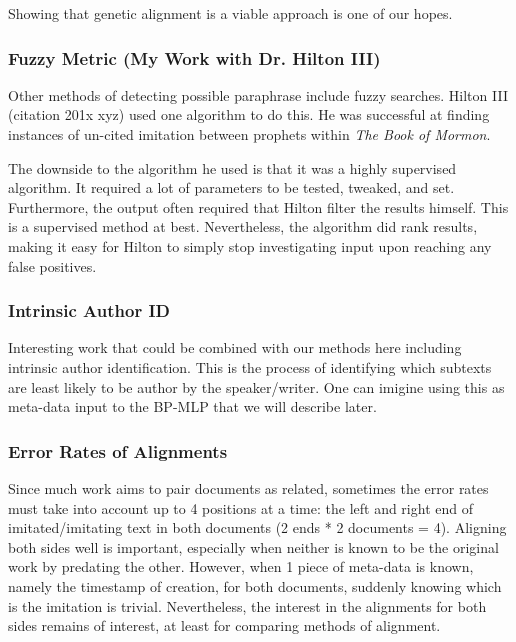 Showing that genetic alignment is a viable approach is one of our hopes.

\subsubsection{Fuzzy Metric (My Work with Dr. Hilton III)}
Other methods of detecting possible paraphrase include fuzzy searches. Hilton III (citation 201x xyz) used one algorithm to do this. He was successful at finding instances of un-cited imitation between prophets within \textit{The Book of Mormon}.

The downside to the algorithm he used is that it was a highly supervised algorithm. It required a lot of parameters to be tested, tweaked, and set. Furthermore, the output often required that Hilton filter the results himself. This is a supervised method at best. Nevertheless, the algorithm did rank results, making it easy for Hilton to simply stop investigating input upon reaching any false positives.

\subsubsection{Intrinsic Author ID}
Interesting work that could be combined with our methods here including intrinsic author identification. This is the process of identifying which subtexts are least likely to be author by the speaker/writer. One can imigine using this as meta-data input to the BP-MLP that we will describe later.

\subsubsection{Error Rates of Alignments}
Since much work aims to pair documents as related, sometimes the error rates must take into account up to 4 positions at a time: the left and right end of imitated/imitating text in both documents (2 ends * 2 documents = 4). %
Aligning both sides well is important, especially when neither is known to be the original work by predating the other. However, when 1 piece of meta-data is known, namely the timestamp of creation, for both documents, suddenly knowing which is the imitation is trivial. Nevertheless, the interest in the alignments for both sides remains of interest, at least for comparing methods of alignment.
